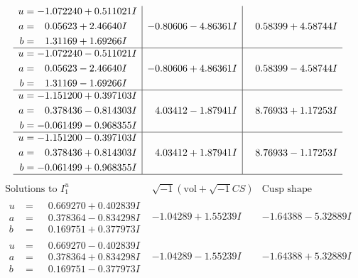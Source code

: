 \documentclass[1p]{elsarticle_modified}
\theoremstyle{definition}
\newcommand{\I}{\sqrt{-1}}
\begin{document}
$$\begin{array}{c|c|c}
\begin{aligned}
u &= -1.072240 + 0.511021 I \\
a &= \phantom{-}0.05623 + 2.46640 I \\
b &= \phantom{-}1.31169 + 1.69266 I\end{aligned}
 & -0.80606 - 4.86361 I & \phantom{-}0.58399 + 4.58744 I \\ \hline\begin{aligned}
u &= -1.072240 - 0.511021 I \\
a &= \phantom{-}0.05623 - 2.46640 I \\
b &= \phantom{-}1.31169 - 1.69266 I\end{aligned}
 & -0.80606 + 4.86361 I & \phantom{-}0.58399 - 4.58744 I \\ \hline\begin{aligned}
u &= -1.151200 + 0.397103 I \\
a &= \phantom{-}0.378436 - 0.814303 I \\
b &= -0.061499 - 0.968355 I\end{aligned}
 & \phantom{-}4.03412 - 1.87941 I & \phantom{-}8.76933 + 1.17253 I \\ \hline\begin{aligned}
u &= -1.151200 - 0.397103 I \\
a &= \phantom{-}0.378436 + 0.814303 I \\
b &= -0.061499 + 0.968355 I\end{aligned}
 & \phantom{-}4.03412 + 1.87941 I & \phantom{-}8.76933 - 1.17253 I\\
 \hline 
 \end{array}$$\newpage$$\begin{array}{c|c|c}  
\text{Solutions to }I^u_{1}& \I (\text{vol} + \sqrt{-1}CS) & \text{Cusp shape}\\
 \hline 
\begin{aligned}
u &= \phantom{-}0.669270 + 0.402839 I \\
a &= \phantom{-}0.378364 - 0.834298 I \\
b &= \phantom{-}0.169751 + 0.377973 I\end{aligned}
 & -1.04289 + 1.55239 I & -1.64388 - 5.32889 I \\ \hline\begin{aligned}
u &= \phantom{-}0.669270 - 0.402839 I \\
a &= \phantom{-}0.378364 + 0.834298 I \\
b &= \phantom{-}0.169751 - 0.377973 I\end{aligned}
 & -1.04289 - 1.55239 I & -1.64388 + 5.32889 I \\ \hline\begin{aligned}

\end{aligned}
\end{array}$$
\end{document}
